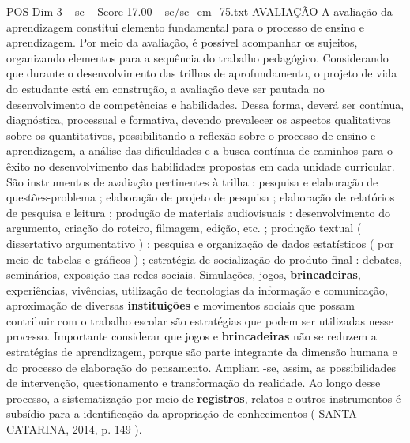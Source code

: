 \begin{textsample}{POS Dim 3 – sc – Score 17.00 – sc/sc\_em\_75.txt}
AVALIAÇÃO A avaliação da aprendizagem constitui elemento fundamental para o processo de ensino e aprendizagem.
Por meio da avaliação, é possível acompanhar os sujeitos, organizando elementos para a sequência do trabalho pedagógico.
Considerando que durante o desenvolvimento das trilhas de aprofundamento, o projeto de vida do estudante está em construção, a avaliação deve ser pautada no desenvolvimento de competências e habilidades.
Dessa forma, deverá ser contínua, diagnóstica, processual e formativa, devendo prevalecer os aspectos qualitativos sobre os quantitativos, possibilitando a reflexão sobre o processo de ensino e aprendizagem, a análise das dificuldades e a busca contínua de caminhos para o êxito no desenvolvimento das habilidades propostas em cada unidade curricular.
São instrumentos de avaliação pertinentes à trilha : pesquisa e elaboração de questões-problema ; elaboração de projeto de pesquisa ; elaboração de relatórios de pesquisa e leitura ; produção de materiais audiovisuais : desenvolvimento do argumento, criação do roteiro, filmagem, edição, etc. ; produção textual ( dissertativo argumentativo ) ; pesquisa e organização de dados estatísticos ( por meio de tabelas e gráficos ) ; estratégia de socialização do produto final : debates, seminários, exposição nas redes sociais.
Simulações, jogos, \textbf{brincadeiras}, experiências, vivências, utilização de tecnologias da informação e comunicação, aproximação de diversas \textbf{instituições} e movimentos sociais que possam contribuir com o trabalho escolar são estratégias que podem ser utilizadas nesse processo.
Importante considerar que jogos e \textbf{brincadeiras} não se reduzem a estratégias de aprendizagem, porque são parte integrante da dimensão humana e do processo de elaboração do pensamento.
Ampliam -se, assim, as possibilidades de intervenção, questionamento e transformação da realidade.
Ao longo desse processo, a sistematização por meio de \textbf{registros}, relatos e outros instrumentos é subsídio para a identificação da apropriação de conhecimentos ( SANTA CATARINA, 2014, p. 149 ).

\end{textsample}
